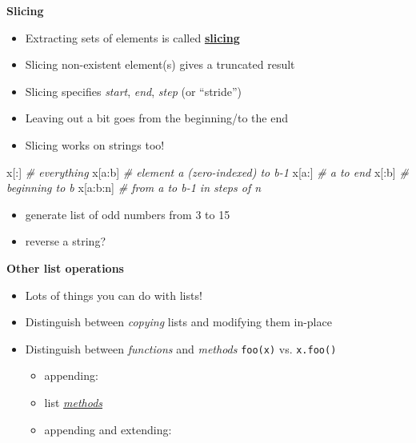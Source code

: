 \documentclass[]{tufte-handout}
\newenvironment{Shaded}{}{}
\newcommand{\CommentTok}[1]{\textcolor[rgb]{0.38,0.63,0.69}{\textit{{#1}}}}
\newcommand{\NormalTok}[1]{{#1}}
\begin{document}
\textbf{Slicing}

\begin{itemize}
\itemsep1pt\parskip0pt
\item
  Extracting sets of elements is called
  \href{http://stackoverflow.com/questions/509211/explain-pythons-slice-notation}{\textbf{slicing}}
\item
  Slicing non-existent element(s) gives a truncated result
\item
  Slicing specifies \emph{start}, \emph{end}, \emph{step} (or
  ``stride'')
\item
  Leaving out a bit goes from the beginning/to the end
\item
  Slicing works on strings too!
\end{itemize}

\begin{Shaded}
\begin{Highlighting}[]
\NormalTok{x[:]        }\CommentTok{# everything}
\NormalTok{x[a:b]      }\CommentTok{# element a (zero-indexed) to b-1}
\NormalTok{x[a:]       }\CommentTok{# a to end}
\NormalTok{x[:b]       }\CommentTok{# beginning to b}
\NormalTok{x[a:b:n]    }\CommentTok{# from a to b-1 in steps of n}
\end{Highlighting}
\end{Shaded}

\begin{itemize}
\itemsep1pt\parskip0pt
\item
  generate list of odd numbers from 3 to 15
\item
  reverse a string?
\end{itemize}

\textbf{Other list operations}

\begin{itemize}
\itemsep1pt\parskip0pt
\item
  Lots of things you can do with lists!
\item
  Distinguish between \emph{copying} lists and modifying them in-place
\item
  Distinguish between \emph{functions} and \emph{methods}
  \texttt{foo(x)} vs. \texttt{x.foo()}

  \begin{itemize}
  \itemsep1pt\parskip0pt
  \item
    appending:
  \item
    list
    \href{http://www.linuxtopia.org/online_books/programming_books/python_programming/python_ch14s07.html}{\emph{methods}}
  \item
    appending and extending:
  \end{itemize}
\end{itemize}
\end{document}
